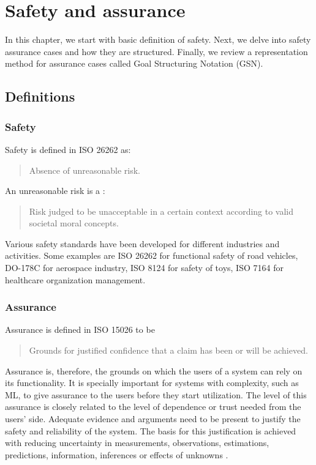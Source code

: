 \chapter{Safety and assurance}
\label{chap:safety}

In this chapter, we start with basic definition of safety. Next, we delve into safety assurance cases and how they are structured. Finally, we review a representation method for assurance cases called Goal Structuring Notation (GSN).

\section{Definitions}
\subsection{Safety}

Safety is defined in ISO 26262 \cite{organization2018iso} as:
\begin{quotation}
Absence of unreasonable risk.
\end{quotation}  
An unreasonable risk is a \cite{organization2018iso}:
\begin{quotation}
Risk judged to be unacceptable in a certain context according to valid societal moral concepts.
\end{quotation}
Various safety standards have been developed for different industries and activities. Some examples are ISO 26262 for functional safety of road vehicles, DO-178C for aerospace industry, ISO 8124 for safety of toys, ISO 7164 for healthcare organization management.

\subsection{Assurance}
Assurance is defined in ISO 15026 to be \cite{iso15026-1-2019}
\begin{quotation}
Grounds for justified confidence that a claim has been or will be achieved.
\end{quotation}
Assurance is, therefore, the grounds on which the users of a system can rely on its functionality. It is specially important for systems with complexity, such as ML, to give assurance to the users before they start utilization. The level of this assurance is closely related to the level of dependence or trust needed from the users' side. Adequate evidence and arguments need to be present to justify the safety and reliability of the system. The basis for this justification is achieved with reducing uncertainty in measurements, observations, estimations, predictions, information, inferences or effects of unknowns \cite{iso15026-1-2019}. 
